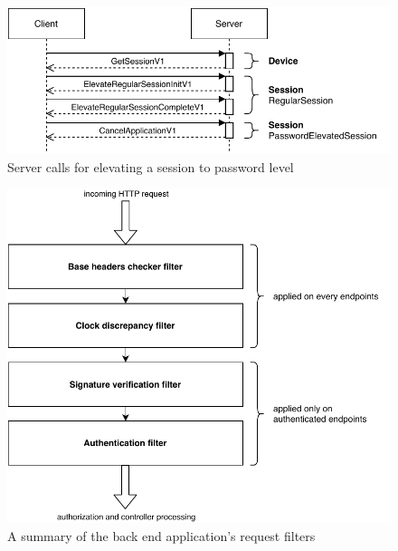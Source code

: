 \begin{figure}[!htb]
    \includegraphics[width=\textwidth]{figures/elevate-to-password-session.pdf}
    \caption{Server calls for elevating a session to password level}
    \label{fig:elevate-to-password-session}
\end{figure}

\begin{figure}[!htb]
    \includegraphics[width=\textwidth]{figures/request-filters.pdf}
    \caption{A summary of the back end application's request filters}
    \label{fig:request-filters}
\end{figure}

